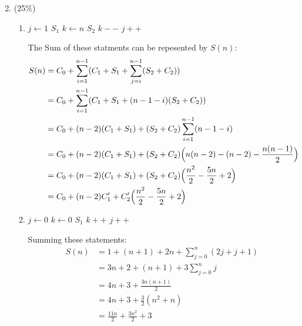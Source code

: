 \documentclass[11pt]{article}
\begin{document}
\begin{enumerate}
\setcounter{enumi}{1}

\item (25\%)
\begin{enumerate}
\item 

\begin{algorithmic}
\State $j \gets 1 $ 
 
    \State $S_1$  
	\State $k \gets n$ 
	 
		\State $S_2$ 
		\State $k--$ 
	\EndWhile
	\State $j++$ 
\EndWhile
\end{algorithmic}

The Sum of these statments can be repesented by $S(n)$:
\begin{align*}
S(n) &= C_0 + \sum_{i=1}^{n-1}(C_1+S_1+\sum_{j=i}^{n-1}(S_2+C_2))
\\&= C_0+\sum_{i=1}^{n-1}(C_1+S_1+(n-1-i)(S_2+C_2))
\\&=C_0+(n-2)(C_1+S_1)+(S_2+C_2)\sum_{i=1}^{n-1}(n-1-i)
\\&=C_0+(n-2)(C_1+S_1)+(S_2+C_2)\Bigl(n(n-2)-(n-2)-\frac{n(n-1)}{2}\Bigr)
\\&=C_0+(n-2)(C_1+S_1)+(S_2+C_2)\Bigl(\frac{n^2}{2} - \frac{5n}{2}+2 \Bigr)
\\&=C_0 + (n-2)C_1'+C_2'\Bigl(\frac{n^2}{2} - \frac{5n}{2}+2 \Bigr)
\end{align*}
\item 
\begin{algorithmic}
\State $j \gets 0$ 
 
	\State $k \gets 0$ 
	 
		\State $S_1$ 
		\State $k++$ 
	\EndWhile
	\State $j++$ 
\EndWhile
\end{algorithmic}
Summing these statements:
\begin{align*}
S(n) &= 1 + (n+1) + 2n + \sum_{j=0}^n (2j+j+1)
\\&= 3n+2 + (n+1) + 3 \sum_{j=0}^n j
\\&= 4n+3 + \frac{3n(n+1)}{2}
\\&= 4n + 3 + \frac{3}{2} (n^2+n)
\\&= \frac{11n}{2} + \frac{3n^2}{2} + 3
\end{align*}
\end{enumerate}
\end{enumerate}
\end{document}

